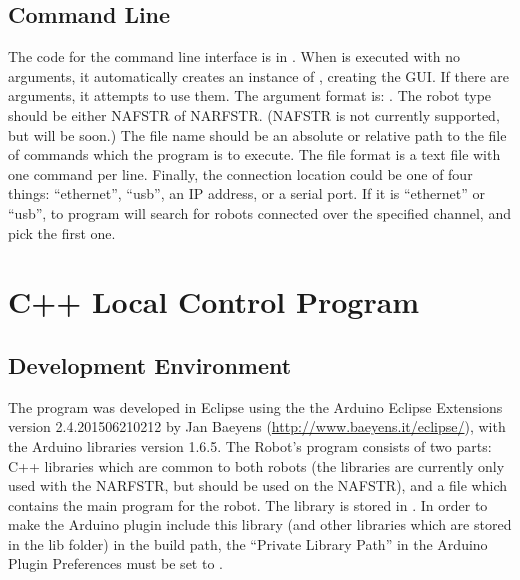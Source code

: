 \documentclass[letterpaper,10pt,english]{sphinxmanual}
\begin{document}
\subsection{Command Line}
\label{ProgramDevelopment:command-line}
The code for the command line interface is in . When  is executed with no arguments, it automatically creates an instance of , creating the GUI. If there are arguments, it attempts to use them. The argument format is: . The robot type should be either NAFSTR of NARFSTR. (NAFSTR is not currently supported, but will be soon.) The file name should be an absolute or relative path to the file of commands which the program is to execute. The file format is a text file with one command per line. Finally, the connection location could be one of four things: ``ethernet'', ``usb'', an IP address, or a serial port. If it is ``ethernet'' or ``usb'', to program will search for robots connected over the specified channel, and pick the first one.


\section{C++ Local Control Program}
\label{ProgramDevelopment:c-local-control-program}

\subsection{Development Environment}
\label{ProgramDevelopment:development-environment}
The program was developed in Eclipse using the the Arduino Eclipse Extensions version 2.4.201506210212 by Jan Baeyens (\href{http://www.baeyens.it/eclipse/}{http://www.baeyens.it/eclipse/}), with the Arduino libraries version 1.6.5. The Robot's program consists of two parts: C++ libraries which are common to both robots (the libraries are currently only used with the NARFSTR, but should be used on the NAFSTR), and a  file which contains the main program for the robot. The  library is stored in . In order to make the Arduino plugin include this library (and other libraries which are stored in the lib folder) in the build path, the ``Private Library Path'' in the Arduino Plugin Preferences must be set to .
\end{document}
